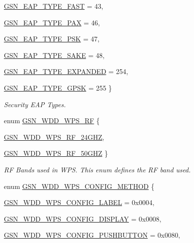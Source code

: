 \begin{DoxyCompactItemize}
\par
\hyperlink{a00677_gga95dd88b436cd52a999dda3865de87fe3a85869e32e8a1a16c23d3618b3ed8e225}{GSN\_\-EAP\_\-TYPE\_\-FAST} =  43, 
\par
\hyperlink{a00677_gga95dd88b436cd52a999dda3865de87fe3a18705e60681f53a9f9550f584565e1c1}{GSN\_\-EAP\_\-TYPE\_\-PAX} =  46, 
\par
\hyperlink{a00677_gga95dd88b436cd52a999dda3865de87fe3af59bb05974539c2b256d125605d7ff05}{GSN\_\-EAP\_\-TYPE\_\-PSK} =  47, 
\par
\hyperlink{a00677_gga95dd88b436cd52a999dda3865de87fe3a19b63475d3d86f29ca46bddd9d67560f}{GSN\_\-EAP\_\-TYPE\_\-SAKE} =  48, 
\par
\hyperlink{a00677_gga95dd88b436cd52a999dda3865de87fe3a16b771a66d69fdda57d88bb29de8e0fc}{GSN\_\-EAP\_\-TYPE\_\-EXPANDED} =  254, 
\par
\hyperlink{a00677_gga95dd88b436cd52a999dda3865de87fe3acc47d3f1a6153d01478076025df045f9}{GSN\_\-EAP\_\-TYPE\_\-GPSK} =  255
 \}
\begin{DoxyCompactList}\small\item\em Security EAP Types. \end{DoxyCompactList}\item 
enum \hyperlink{a00604_ab0a95842655918bdbd767751d8abb95d}{GSN\_\-WDD\_\-WPS\_\-RF} \{ \par
\hyperlink{a00604_ab0a95842655918bdbd767751d8abb95da7b068fc232863052eff874c02e216092}{GSN\_\-WDD\_\-WPS\_\-RF\_\-24GHZ}, 
\par
\hyperlink{a00604_ab0a95842655918bdbd767751d8abb95da90aaaeefa5d06360615d9a976afcb9ac}{GSN\_\-WDD\_\-WPS\_\-RF\_\-50GHZ}
 \}
\begin{DoxyCompactList}\small\item\em RF Bands used in WPS. This enum defines the RF band used. \end{DoxyCompactList}\item 
enum \hyperlink{a00604_aaf56a679ef5989460c2d2bad97d4c353}{GSN\_\-WDD\_\-WPS\_\-CONFIG\_\-METHOD} \{ \par
\hyperlink{a00604_aaf56a679ef5989460c2d2bad97d4c353aa84f0cd36d3a83757189450bbbf7d26d}{GSN\_\-WDD\_\-WPS\_\-CONFIG\_\-LABEL} =  0x0004, 
\par
\hyperlink{a00604_aaf56a679ef5989460c2d2bad97d4c353aab1edda457f858557986fa954172ead6}{GSN\_\-WDD\_\-WPS\_\-CONFIG\_\-DISPLAY} =  0x0008, 
\par
\hyperlink{a00604_aaf56a679ef5989460c2d2bad97d4c353ada7a318dba43d889333f8677743b2c6b}{GSN\_\-WDD\_\-WPS\_\-CONFIG\_\-PUSHBUTTON} =  0x0080, 

\end{DoxyCompactItemize}

